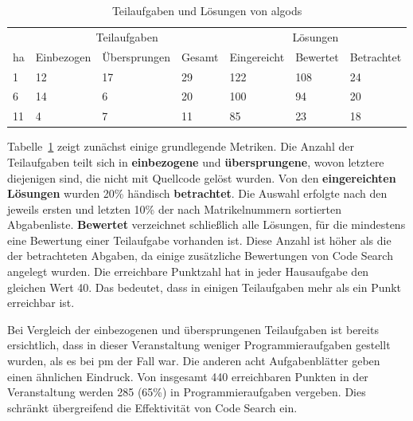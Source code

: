 \begin{table}
    \centering
    \caption{Teilaufgaben und Lösungen von \ac{algods}}
    \begin{tabular}{|l|l|l|l|l|l|l|}
    \hline
        ~ & \multicolumn{3}{c|}{Teilaufgaben} & \multicolumn{3}{c|}{Lösungen} \\
        \acs{ha} & Einbezogen & Übersprungen & Gesamt & Eingereicht & Bewertet & Betrachtet \\ \hline
        1  & 12 & 17 & 29 & 122 & 108 & 24 \\ \hline
        6  & 14 &  6 & 20 & 100 &  94 & 20 \\ \hline
        11 &  4 &  7 & 11 &  85 &  23 & 18 \\ \hline
    \end{tabular}
    \label{tbl:algods-basics}
\end{table}

Tabelle~\ref{tbl:algods-basics} zeigt zunächst einige grundlegende Metriken.
Die Anzahl der Teilaufgaben teilt sich in \textbf{einbezogene} und \textbf{übersprungene}, wovon letztere diejenigen sind, die nicht mit Quellcode gelöst wurden.
Von den \textbf{eingereichten Lösungen} wurden 20\% händisch \textbf{betrachtet}.
Die Auswahl erfolgte nach den jeweils ersten und letzten 10\% der nach Matrikelnummern sortierten Abgabenliste.
\textbf{Bewertet} verzeichnet schließlich alle Lösungen, für die mindestens eine Bewertung einer Teilaufgabe vorhanden ist.
Diese Anzahl ist höher als die der betrachteten Abgaben, da einige zusätzliche Bewertungen von Code Search angelegt wurden.
Die erreichbare Punktzahl hat in jeder Hausaufgabe den gleichen Wert 40.
Das bedeutet, dass in einigen Teilaufgaben mehr als ein Punkt erreichbar ist.

Bei Vergleich der einbezogenen und übersprungenen Teilaufgaben ist bereits ersichtlich, dass in dieser Veranstaltung weniger Programmieraufgaben gestellt wurden, als es bei \ac{pm} der Fall war.
Die anderen acht Aufgabenblätter geben einen ähnlichen Eindruck.
Von insgesamt 440 erreichbaren Punkten in der Veranstaltung werden 285 (65\%) in Programmieraufgaben vergeben.
Dies schränkt übergreifend die Effektivität von Code Search ein.

